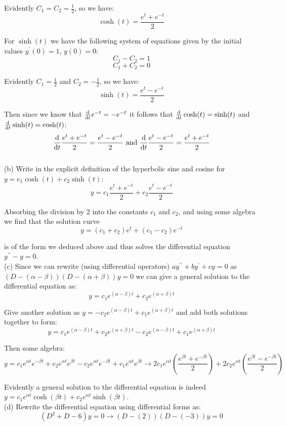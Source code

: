 \documentclass[11pt]{article}
\newcommand{\br}[1]{\left(#1\right)}
\newcommand{\dprime}{\prime\prime}
\begin{document}
Evidently $C_1 = C_2 = \frac{1}{2}$, so we have:
$$\cosh(t) = \frac{e^t + e^{-t}}{2}$$

For $\sinh(t)$ we have the following system of equations given by the initial values $y^{\prime}(0) = 1$, $y(0) = 0$:
$$C_1 - C_2 = 1$$
$$C_1 + C_2 = 0$$

Evidently $C_1 = \frac{1}{2}$ and $C_2 = -\frac{1}{2}$, so we have:
$$\sinh(t) = \frac{e^t - e^{-t}}{2}$$

Then since we know that $\dv{t}e^{-t} = -e^{-t}$ it follows that $\dv{t}\cosh(t) = \sinh(t)$ and $\dv{t}\sinh(t) = \cosh(t)$:
$$\dv{t}\frac{e^t + e^{-t}}{2} = \frac{e^t - e^{-t}}{2} \text{ and } \dv{t}\frac{e^t - e^{-t}}{2} = \frac{e^t + e^{-t}}{2}$$ \\

(b) Write in the explicit definition of the hyperbolic sine and cosine for $y = c_1\cosh(t) + c_2\sinh(t)$:
$$y = c_1\frac{e^t + e^{-t}}{2} + c_2\frac{e^t - e^{-t}}{2}$$

Absorbing the division by 2 into the constants $c_1$ and $c_2$, and using some algebra we find that the solution curve 
$$y = \br{c_1+c_2}e^t + \br{c_1-c_2}e^{-t}$$

is of the form we deduced above and thus solves the differential equation $y^{\dprime} - y = 0$. \\

(c) Since we can rewrite (using differential operators) $ay^{\dprime} + by^{\prime} + cy = 0$ as $\br{D-\br{\alpha - \beta}}\br{D-\br{\alpha + \beta}}y = 0$ we can give a general solution to the differential equation as:
$$y = c_1e^{\br{\alpha - \beta}t} + c_2e^{\br{\alpha + \beta}t}$$

Give another solution as $y = -c_2e^{\br{\alpha - \beta}t} + c_1e^{\br{\alpha + \beta}t}$ and add both solutions together to form:
$$y = c_1e^{\br{\alpha - \beta}t} + c_2e^{\br{\alpha + \beta}t} - c_2e^{\br{\alpha - \beta}t} + c_1e^{\br{\alpha + \beta}t}$$

Then some algebra:
$$y = c_1e^{\alpha t}e^{-\beta t} + c_2e^{\alpha t}e^{\beta t} - c_2e^{\alpha t}e^{-\beta t} + c_1e^{\alpha t}e^{\beta t} \to 2c_1e^{\alpha t}\br{\frac{e^{\beta t} + e^{-\beta t}}{2}} + 2c_2e^{\alpha t}\br{\frac{e^{\beta t} - e^{-\beta t}}{2}}$$

Evidently a general solution to the differential equation is indeed $y = c_1e^{\alpha t}\cosh(\beta t) + c_2e^{\alpha t}\sinh(\beta t)$. \\

(d) Rewrite the differential equation using differential forms as:
$$\br{D^2 + D - 6}y = 0 \to \br{D-(2)}\br{D-(-3)}y = 0$$
\end{document}
